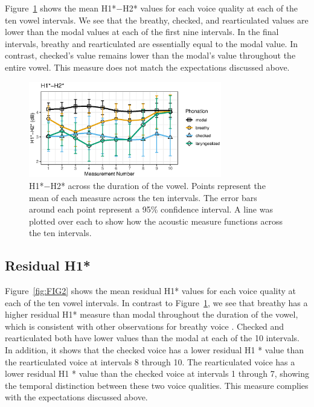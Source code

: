 Figure~\ref{fig:FIG1} shows the mean H1*$-$H2* values for each voice quality at each of the ten vowel intervals. We see that the breathy, checked, and rearticulated values are lower than the modal values at each of the first nine intervals. In the final intervals, breathy and rearticulated are essentially equal to the modal value. In contrast, checked's value remains lower than the modal's value throughout the entire vowel. This measure does not match the expectations discussed above.

\begin{figure}[htbp]
  \centering
  \includegraphics[width = 0.75\textwidth]{images/Figure1.eps}
  \caption{\label{fig:FIG1}{H1*$-$H2* across the duration of the vowel. Points represent the mean of each measure across the ten intervals. The error bars around each point represent a 95\% confidence interval. A line was plotted over each to show how the acoustic measure functions across the ten intervals.}}
\end{figure}

\subsection{Residual H1*} \label{sec:ResidH1}

Figure~\ref{fig:FIG2} shows the mean residual H1* values for each voice quality at each of the ten vowel intervals. In contrast to Figure~\ref{fig:FIG1}, we see that breathy has a higher residual H1* measure than modal throughout the duration of the vowel, which is consistent with other observations for breathy voice \citep{fischer-jorgensenPhoneticAnalysisBreathy1968}. Checked and rearticulated both have lower values than the modal at each of the 10 intervals. In addition, it shows that the checked voice has a lower residual H1 * value than the rearticulated voice at intervals 8 through 10. The rearticulated voice has a lower residual H1 * value than the checked voice at intervals 1 through 7, showing the temporal distinction between these two voice qualities. This measure complies with the expectations discussed above. 

